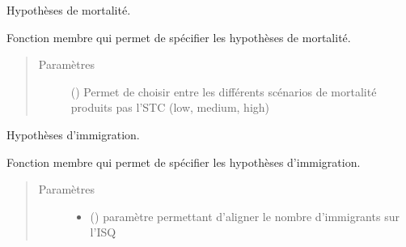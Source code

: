 \documentclass[letterpaper,10pt,french]{sphinxmanual}
\begin{document}
\begin{fulllineitems}
\begin{fulllineitems}
\begin{quote}
\begin{description}
\begin{itemize}
\end{itemize}

\end{description}\end{quote}

\end{fulllineitems}


\begin{fulllineitems}
\label{\detokenize{code:simgen.model.dead_assumptions}}
Hypothèses de mortalité.

Fonction membre qui permet de spécifier les hypothèses de mortalité.
\begin{quote}\begin{description}
\item[{Paramètres}] \leavevmode
{} () \textendash{} Permet de choisir entre les différents scénarios de mortalité produits pas l’STC (low, medium, high)

\end{description}\end{quote}

\end{fulllineitems}


\begin{fulllineitems}
\label{\detokenize{code:simgen.model.immig_assumptions}}
Hypothèses d’immigration.

Fonction membre qui permet de spécifier les hypothèses d’immigration.
\begin{quote}\begin{description}
\item[{Paramètres}] \leavevmode\begin{itemize}
\item {} 
 () \textendash{} paramètre permettant d’aligner le nombre d’immigrants sur l’ISQ


\end{itemize}
\end{description}
\end{quote}
\end{fulllineitems}
\end{fulllineitems}
\end{document}
